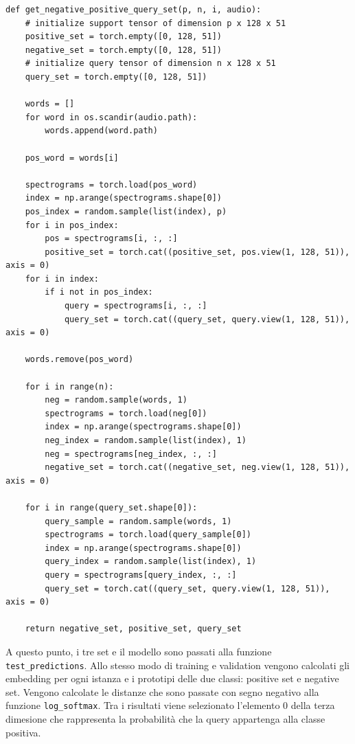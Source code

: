 \documentclass[12pt,a4paper,titlepage]{article}
\begin{document}
\begin{lstlisting}[language=iPython,firstnumber=33, caption=Funzione \texttt{get\_negative\_positive\_query\_set}, label=get_negative_positive_query_set,captionpos=b]
def get_negative_positive_query_set(p, n, i, audio):
    # initialize support tensor of dimension p x 128 x 51
    positive_set = torch.empty([0, 128, 51])
    negative_set = torch.empty([0, 128, 51])
    # initialize query tensor of dimension n x 128 x 51
    query_set = torch.empty([0, 128, 51])
    
    words = []
    for word in os.scandir(audio.path):
        words.append(word.path)
        
    pos_word = words[i]

    spectrograms = torch.load(pos_word)
    index = np.arange(spectrograms.shape[0])
    pos_index = random.sample(list(index), p)
    for i in pos_index:
        pos = spectrograms[i, :, :]
        positive_set = torch.cat((positive_set, pos.view(1, 128, 51)), axis = 0)
    for i in index:
        if i not in pos_index:
            query = spectrograms[i, :, :]
            query_set = torch.cat((query_set, query.view(1, 128, 51)), axis = 0)
            
    words.remove(pos_word)

    for i in range(n):
        neg = random.sample(words, 1)
        spectrograms = torch.load(neg[0])
        index = np.arange(spectrograms.shape[0])
        neg_index = random.sample(list(index), 1)
        neg = spectrograms[neg_index, :, :]
        negative_set = torch.cat((negative_set, neg.view(1, 128, 51)), axis = 0)

    for i in range(query_set.shape[0]):
        query_sample = random.sample(words, 1)
        spectrograms = torch.load(query_sample[0])
        index = np.arange(spectrograms.shape[0])
        query_index = random.sample(list(index), 1)
        query = spectrograms[query_index, :, :]
        query_set = torch.cat((query_set, query.view(1, 128, 51)), axis = 0)

    return negative_set, positive_set, query_set
\end{lstlisting}

A questo punto, i tre set e il modello sono passati alla funzione \texttt{test\_predictions}.
Allo stesso modo di training e validation vengono calcolati gli embedding per ogni istanza e i prototipi delle due classi: positive set e negative set.
Vengono calcolate le distanze che sono passate con segno negativo alla funzione \texttt{log\_softmax}. Tra i risultati viene selezionato l'elemento 0 della terza dimesione che rappresenta la probabilità che la query appartenga alla classe positiva.
\end{document}

